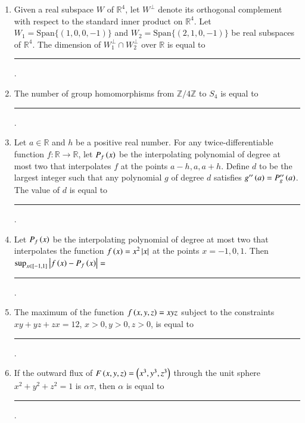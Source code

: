 \documentclass[journal,12pt,onecolumn]{IEEEtran}
\theoremstyle{remark}
\begin{document}
\begin{enumerate}
\item Given a real subspace $W$ of $\mathbb{R}^4$, let $W^\perp$ denote its orthogonal complement with respect to the standard inner product on $\mathbb{R}^4$. Let $W_1 = \text{Span}\{(1, 0, 0, -1)\}$ and $W_2 = \text{Span}\{(2, 1, 0, -1)\}$ be real subspaces of $\mathbb{R}^4$. The dimension of $W_1^\perp \cap W_2^\perp$ over $\mathbb{R}$ is equal to \rule{3cm}{0.15mm} . \hfill{}

\item The number of group homomorphisms from $\mathbb{Z}/4\mathbb{Z}$ to $S_4$ is equal to \rule{3cm}{0.15mm} . \hfill{}

\item Let $a \in \mathbb{R}$ and $h$ be a positive real number. For any twice-differentiable function $f \colon \mathbb{R} \to \mathbb{R}$, let $P_f\left(x\right)$ be the interpolating polynomial of degree at most two that interpolates $f$ at the points $a-h, a, a+h$. Define $d$ to be the largest integer such that any polynomial $g$ of degree $d$ satisfies $g''\left(a\right) = P''_g\left(a\right)$. The value of $d$ is equal to \rule{3cm}{0.15mm} . \hfill{}

\item Let $P_f\left(x\right)$ be the interpolating polynomial of degree at most two that interpolates the function $f\left(x\right) = x^2\left\vert x\right\vert$ at the points $x = -1, 0, 1$. Then $\sup_{x \in [-1, 1]} \left\vert f\left(x\right) - P_f\left(x\right)\right\vert = $ \rule{3cm}{0.15mm} . \hfill{}

\item The maximum of the function $f\left(x, y, z\right) = xyz$ subject to the constraints $xy + yz + zx = 12$, $x > 0, y > 0, z > 0$, is equal to \rule{3cm}{0.15mm} . \hfill{}

\item If the outward flux of $F\left(x, y, z\right) = \left(x^3, y^3, z^3\right)$ through the unit sphere $x^2 + y^2 + z^2 = 1$ is $\alpha\pi$, then $\alpha$ is equal to \rule{3cm}{0.15mm} . \hfill{}


\end{enumerate}
\end{document}
